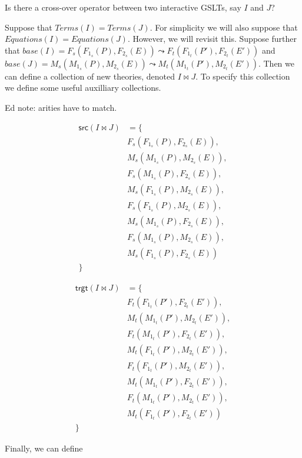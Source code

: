 \documentclass{article}
\begin{document}
Is there a cross-over operator between two interactive GSLTs, say $I$ and $J$?

Suppose that $Terms( I ) = Terms( J )$. For simplicity we will also
suppose that $Equations( I ) = Equations( J )$. However, we will
revisit this.  Suppose further that $base( I ) = F_s( F_{1_s}( P ),
F_{2_s}( E ) ) \leadsto F_t( F_{1_t}( P' ), F_{2_t}( E' ) )$ and $base( J ) = M_s(
M_{1_s}( P ), M_{2_s}( E ) ) \leadsto M_t( M_{1_t}( P' ), M_{2_t}( E' ) )$.  Then we
can define a collection of new theories, denoted $I \Join J$. To
specify this collection we define some useful auxilliary collections.

Ed note: arities have to match.

\begin{align}
  \mathsf{src}( I \Join J ) &= \{ \\
    & F_s( F_{1_s}( P ), F_{2_s}( E ) ),\\
    & M_s( M_{1_s}( P ), M_{2_s}( E ) ),\\
    & F_s( M_{1_s}( P ), F_{2_s}( E ) ),\\
    & M_s( F_{1_s}( P ), M_{2_s}( E ) ),\\
    & F_s( F_{1_s}( P ), M_{2_s}( E ) ),\\
    & M_s( M_{1_s}( P ), F_{2_s}( E ) ),\\
    & F_s( M_{1_s}( P ), M_{2_s}( E ) ),\\
    & M_s( F_{1_s}( P ), F_{2_s}( E ) )\\
  \}
\end{align}

\begin{align}
  \mathsf{trgt}( I \Join J ) &= \{ \\
    & F_t( F_{1_t}( P' ), F_{2_t}( E' ) ),\\
    & M_t( M_{1_t}( P' ), M_{2_t}( E' ) ),\\
    & F_t( M_{1_t}( P' ), F_{2_t}( E' ) ),\\
    & M_t( F_{1_t}( P' ), M_{2_t}( E' ) ),\\
    & F_t( F_{1_t}( P' ), M_{2_t}( E' ) ),\\
    & M_t( M_{1_t}( P' ), F_{2_t}( E' ) ),\\
    & F_t( M_{1_t}( P' ), M_{2_t}( E' ) ),\\
    & M_t( F_{1_t}( P' ), F_{2_t}( E' ) )\\
  \}
\end{align}

Finally, we can define
\end{document}
